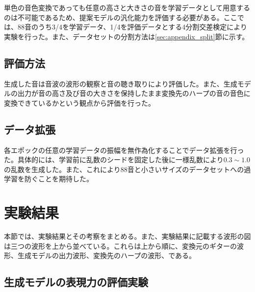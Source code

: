 単色の音色変換であっても任意の高さと大きさの音を学習データとして用意するのは不可能であるため、提案モデルの汎化能力を評価する必要がある。ここでは、88音のうち3/4を学習データ、1/4を評価データとする4分割交差検定により実験を行った。また、データセットの分割方法は\ref{sec:appendix_split}節に示す。

\subsection{評価方法}

生成した音は音波の波形の観察と音の聴き取りにより評価した。また、生成モデルの出力が音の高さ及び音の大きさを保持したまま変換先のハープの音の音色に変換できているかという観点から評価を行った。

\subsection{データ拡張}

各エポックの任意の学習データの振幅を無作為化することでデータ拡張を行った。具体的には、学習前に乱数のシードを固定した後に一様乱数により$0.3\sim1.0$の乱数を生成した。また、これにより88音と小さいサイズのデータセットへの過学習を防ぐことを期待した。


\section{実験結果}

本節では、実験結果とその考察をまとめる。また、実験結果に記載する波形の図は三つの波形を上から並べている。これらは上から順に、変換元のギターの波形、生成モデルの出力波形、変換先のハープの波形、である。

\subsection{生成モデルの表現力の評価実験}
\label{sec:expression}

